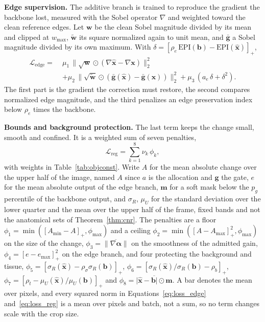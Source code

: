 \textbf{Edge supervision.} The additive branch is trained to reproduce the gradient the backbone
lost, measured with the Sobel operator $\nabla$ and weighted toward the clean reference edges. Let $\mathbf{w}$ be the clean Sobel magnitude divided by its mean and clipped
at $w_{\max}$, $\tilde{\mathbf{w}}$ its square normalized again to unit mean, and $\bar{\mathbf{g}}$ a
Sobel magnitude divided by its own maximum. With
$\delta = [\rho_e\,\mathrm{EPI}(\mathbf{b}) - \mathrm{EPI}(\hat{\mathbf{x}})]_+$,
\begin{equation}
\begin{split}
\mathcal{L}_{\mathrm{edge}} = \;&\mu_{1}\,\big\lVert \sqrt{\mathbf{w}} \odot
  (\nabla\hat{\mathbf{x}} - \nabla\mathbf{x}) \big\rVert_2^2 \\
 &+ \mu_{2}\,\big\lVert \sqrt{\tilde{\mathbf{w}}} \odot
  (\bar{\mathbf{g}}(\hat{\mathbf{x}}) - \bar{\mathbf{g}}(\mathbf{x})) \big\rVert_2^2
 + \mu_{3}\,(a_e\,\delta + \delta^2).
\end{split}
\label{eq:loss_edge}
\end{equation}
The first part is the gradient the correction must restore, the second compares normalized edge
magnitude, and the third penalizes an edge preservation index below $\rho_e$ times the backbone.

\textbf{Bounds and background protection.} The last term keeps the change small, smooth and
confined. It is a weighted sum of seven penalties,
\begin{equation}
\mathcal{L}_{\mathrm{reg}} = \sum_{k=1}^{8} \nu_k \, \phi_k ,
\label{eq:loss_reg}
\end{equation}
with weights in Table~\ref{tab:objconst}. Write $A$ for the mean absolute
change over the upper half of the image, named $A$ since $a$ is the allocation and $\mathbf{g}$ the
gate, $e$ for the mean absolute output of the edge branch, $\mathbf{m}$ for a soft mask below the
$p_g$ percentile of the backbone output, and $\sigma_R$, $\mu_U$ for the standard deviation over the
lower quarter and the mean over the upper half of the frame, fixed bands and not the anatomical sets
of Theorem~\ref{thm:cnr}. The penalties are a floor $\phi_1 = \min([A_{\min} - A]_+, \phi_{\max})$ and a ceiling
$\phi_2 = \min([A - A_{\max}]_+^2, \phi_{\max})$ on the size of the change,
$\phi_3 = \overline{\lVert \nabla \boldsymbol{\alpha} \rVert}$ on the smoothness of the admitted
gain, $\phi_4 = [e - e_{\max}]_+^2$ on the edge branch, and four protecting the background and
tissue, $\phi_5 = [\sigma_R(\hat{\mathbf{x}}) - \rho_\sigma \sigma_R(\mathbf{b})]_+$,
$\phi_6 = [\sigma_R(\hat{\mathbf{x}})/\sigma_R(\mathbf{b}) - \rho_b]_+$,
$\phi_7 = [\rho_t - \mu_U(\hat{\mathbf{x}})/\mu_U(\mathbf{b})]_+$ and
$\phi_8 = \overline{\lvert \hat{\mathbf{x}} - \mathbf{b} \rvert \odot \mathbf{m}}$. A bar denotes the mean over pixels, and every squared norm in
Equations~\eqref{eq:loss_edge} and~\eqref{eq:loss_reg} is a mean over pixels and batch, not a sum,
so no term changes scale with the crop size.

